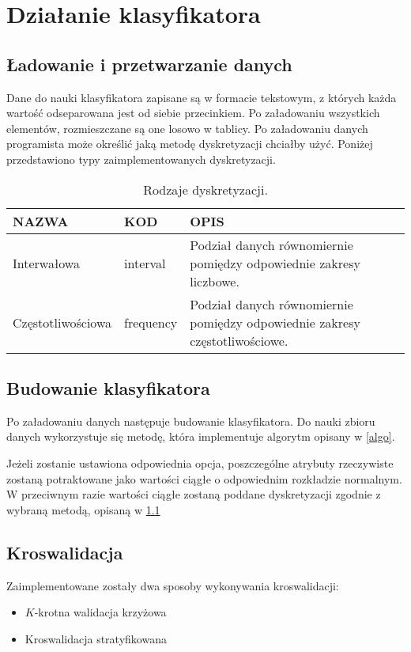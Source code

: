 \chapter{Działanie klasyfikatora}
	\section{Ładowanie i przetwarzanie danych}\label{discret}
Dane do nauki klasyfikatora zapisane są w formacie tekstowym, z których każda wartość odseparowana jest od siebie przecinkiem. Po załadowaniu wszystkich elementów, rozmieszczane są one losowo w tablicy. Po załadowaniu danych programista może określić jaką metodę dyskretyzacji chciałby użyć. Poniżej przedstawiono typy zaimplementowanych dyskretyzacji.
\begin{table}[H]
\centering
\caption{Rodzaje dyskretyzacji.}
\label{dist-ukm}
\begin{tabular}{  ll m{8cm}}
NAZWA & KOD & OPIS\\\hline
Interwałowa & interval & Podział danych równomiernie pomiędzy odpowiednie zakresy liczbowe.\\\hline
Częstotliwościowa & frequency & Podział danych równomiernie pomiędzy odpowiednie zakresy częstotliwościowe. \\\hline
\end{tabular}
\end{table}
	\section{Budowanie klasyfikatora}
Po załadowaniu danych następuje budowanie klasyfikatora. Do nauki zbioru danych wykorzystuje się metodę, która implementuje algorytm opisany w \ref{algo}. 

Jeżeli zostanie ustawiona odpowiednia opcja, poszczególne atrybuty rzeczywiste zostaną potraktowane jako wartości ciągłe o odpowiednim rozkładzie normalnym. W przeciwnym razie wartości ciągłe zostaną poddane dyskretyzacji zgodnie z wybraną metodą, opisaną w \ref{discret}
	\section{Kroswalidacja}
Zaimplementowane zostały dwa sposoby wykonywania kroswalidacji:
\begin{itemize}
\item $K$-krotna walidacja krzyżowa
\item Kroswalidacja stratyfikowana
\end{itemize}

